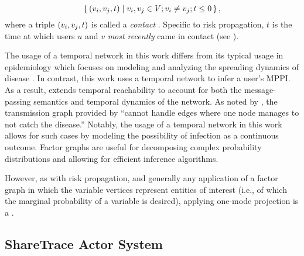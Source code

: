 \begin{equation}
    \setBuilder{(\vVariable[i], \vVariable[j], t)}{\vVariable[i], \vVariable[j] \in \vVariables; \vVariable[i] \neq \vVariable[j]; t \leq 0}, \label{eq:contact-seq}
\end{equation}
%
where a triple $(\vVariable[i], \vVariable[j], t)$ is called a \emph{contact} \cite{Holme2012}. Specific to risk propagation, $t$ is the time at which users $u$ and $v$ \emph{most recently} came in contact (see ).

The usage of a temporal network in this work differs from its typical usage in epidemiology which focuses on modeling and analyzing the spreading dynamics of disease \cite{Riolo2001, Danon2011, Lokhov2014, Craft2015, Pastor-Satorras2015, Koher2019, Zino2021}. In contrast, this work uses a temporal network to infer a user's MPPI. As a result,  extends temporal reachability to account for both the message-passing semantics and temporal dynamics of the network. As noted by \cite{Holme2012}, the transmission graph provided by \cite{Riolo2001} ``cannot handle edges where one node manages to not catch the disease.'' Notably, the usage of a temporal network in this work allows for such cases by modeling the possibility of infection as a continuous outcome.
Factor graphs are useful for decomposing complex probability distributions and allowing for efficient inference algorithms.

However, as with risk propagation, and generally any application of a factor graph in which the variable vertices represent entities of interest (i.e., of which the marginal probability of a variable is desired), applying one-mode projection is a .

\subsection{ShareTrace Actor System}

